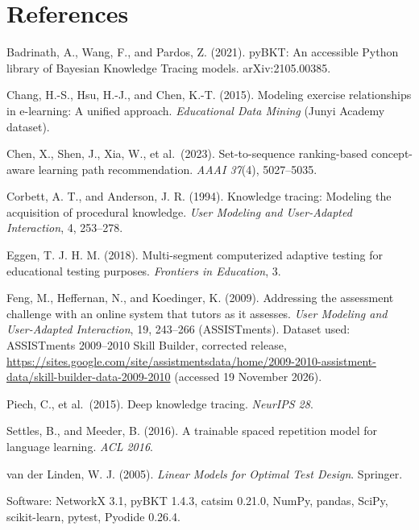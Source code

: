 \documentclass[english]{sintr}
\renewcommand{\thesection}{\arabic{section}}
\begin{document}
\section*{References}
\begin{enumerate}[label={[\arabic*]},leftmargin=2.2em]
    \item Badrinath, A., Wang, F., and Pardos, Z. (2021). pyBKT: An accessible Python library of Bayesian Knowledge Tracing models. arXiv:2105.00385.
    \item Chang, H.-S., Hsu, H.-J., and Chen, K.-T. (2015). Modeling exercise relationships in e-learning: A unified approach. \textit{Educational Data Mining} (Junyi Academy dataset).
    \item Chen, X., Shen, J., Xia, W., et al.\ (2023). Set-to-sequence ranking-based concept-aware learning path recommendation. \textit{AAAI 37}(4), 5027--5035.
    \item Corbett, A. T., and Anderson, J. R. (1994). Knowledge tracing: Modeling the acquisition of procedural knowledge. \textit{User Modeling and User-Adapted Interaction}, 4, 253--278.
    \item Eggen, T. J. H. M. (2018). Multi-segment computerized adaptive testing for educational testing purposes. \textit{Frontiers in Education}, 3.
    \item Feng, M., Heffernan, N., and Koedinger, K. (2009). Addressing the assessment challenge with an online system that tutors as it assesses. \textit{User Modeling and User-Adapted Interaction}, 19, 243--266 (ASSISTments). Dataset used: ASSISTments 2009--2010 Skill Builder, corrected release, \url{https://sites.google.com/site/assistmentsdata/home/2009-2010-assistment-data/skill-builder-data-2009-2010} (accessed 19 November 2026).
    \item Piech, C., et al.\ (2015). Deep knowledge tracing. \textit{NeurIPS 28}.
    \item Settles, B., and Meeder, B. (2016). A trainable spaced repetition model for language learning. \textit{ACL 2016}.
    \item van der Linden, W. J. (2005). \textit{Linear Models for Optimal Test Design}. Springer.
    \item Software: NetworkX 3.1, pyBKT 1.4.3, catsim 0.21.0, NumPy, pandas, SciPy, scikit-learn, pytest, Pyodide 0.26.4.
\end{enumerate}

\newpage
\appendix
\renewcommand{\thesection}{\Alph{section}}
\end{document}
